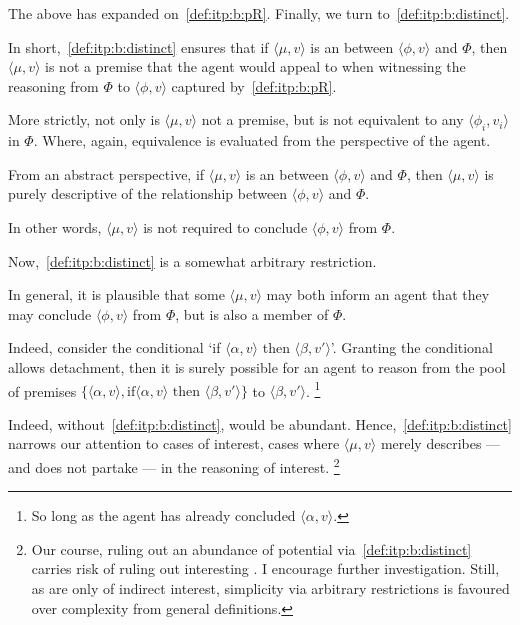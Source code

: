 \begin{note}
  The above has expanded on~\ref{def:itp:b:pR}.
  Finally, we turn to~\ref{def:itp:b:distinct}.

  In short,~\ref{def:itp:b:distinct} ensures that if \(\langle \mu,v \rangle\) is an  between \(\langle \phi,v \rangle\) and \(\Phi\), then \(\langle \mu,v \rangle\) is not a premise that the agent would appeal to when witnessing the reasoning from \(\Phi\) to \(\langle \phi,v \rangle\) captured by~\ref{def:itp:b:pR}.

  More strictly, not only is \(\langle \mu,v \rangle\) not a premise, but is not equivalent to any \(\langle \phi_{i},v_{i} \rangle\) in \(\Phi\).
  Where, again, equivalence is evaluated from the perspective of the agent.

  From an abstract perspective, if \(\langle \mu,v \rangle\) is an  between \(\langle \phi,v \rangle\) and \(\Phi\), then \(\langle \mu,v \rangle\) is purely descriptive of the relationship between \(\langle \phi,v \rangle\) and \(\Phi\).

  In other words, \(\langle \mu,v \rangle\) is not required to conclude \(\langle \phi,v \rangle\) from \(\Phi\).

  Now,~\ref{def:itp:b:distinct} is a somewhat arbitrary restriction.

  In general, it is plausible that some \(\langle \mu,v \rangle\) may both inform an agent that they may conclude \(\langle \phi,v \rangle\) from \(\Phi\), but is also a member of \(\Phi\).

  Indeed, consider the conditional `if \(\langle \alpha,v \rangle\) then \(\langle \beta,v' \rangle\)'.
  Granting the conditional allows detachment, then it is surely possible for an agent to reason from the pool of premises \(\{\langle \alpha,v \rangle, \text{if} \langle \alpha,v \rangle \text{ then } \langle \beta,v' \rangle\}\) to \(\langle \beta,v' \rangle\).%
  \footnote{
    So long as the agent has already concluded \(\langle \alpha,v \rangle\).
  }

  Indeed, without~\ref{def:itp:b:distinct},  would be abundant.
  Hence,~\ref{def:itp:b:distinct} narrows our attention to cases of interest, cases where \(\langle \mu,v \rangle\) merely describes --- and does not partake --- in the reasoning of interest.%
  \footnote{
    Our course, ruling out an abundance of potential  via~\ref{def:itp:b:distinct} carries risk of ruling out interesting .
    I encourage further investigation.
    Still, as  are only of indirect interest, simplicity via arbitrary restrictions is favoured over complexity from general definitions.
  }
\end{note}

